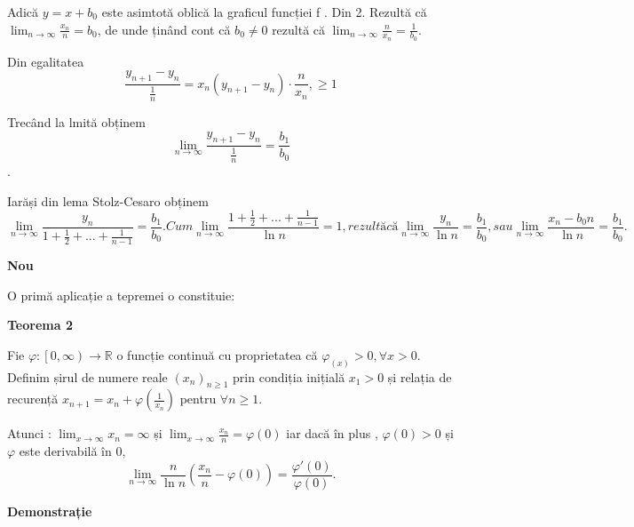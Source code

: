 \documentclass[a4paper,12pt,oneside]{report}
\begin{document}
Adică \(y=x+b_{0}\) este asimtotă oblică la graficul funcției f . Din 2. Rezultă că \(\lim_{n \to \infty }\frac{x_{n}}{n} = b_{0}\), de unde ținând cont că \(b_{0}\neq 0\) rezultă că \(\lim_{n \to \infty }\frac{n}{x_{n}} = \frac{1}{b_{0}}\). 


Din egalitatea
 \begin{displaymath}
  \frac{y_{n+1} - y_{n}}{\frac{1}{n}} = x_{n}\left ( y_{n+1} -y_{n}\right )\cdot \frac{n}{x_{n}}, \geq 1
\end{displaymath}

Trecând la lmită obținem 
\begin{displaymath}
  \lim_{n \to \infty }\frac{y_{n+1} - y_{n}}{\frac{1}{n}} = \frac{b_{1}}{b_{0}}
\end{displaymath}
.

Iarăși din lema Stolz-Cesaro obținem 
\begin{displaymath}
  \lim_{n \to \infty }\frac{y_{n}}{1+\frac{1}{2}+...+\frac{1}{n-1}} = \frac{b_{1}}{b_{0}} . Cum \lim_{n \to \infty }\frac{{1+\frac{1}{2}+...+\frac{1}{n-1}}}{\ln n} = 1, rezultă că \lim_{n \to \infty }\frac{y_{n}}{\ln n } = \frac{b_{1}}{b_{0}}, sau \lim_{n \to \infty }\frac{x_{n}-b_{0}n}{\ln n }  = \frac{b_{1}}{b_{0}}.
\end{displaymath}




\textbf{Nou}



O primă aplicație a tepremei o constituie:

\textbf{Teorema 2}

Fie \(\varphi : \left [ 0,\infty  \right ) \to \mathbb{R}\) o funcție continuă cu proprietatea că \(\varphi_{\left ( x \right )}> 0, \forall x> 0\). Definim șirul de numere reale \(\left ( x_{n} \right )_{n\geq 1}\) prin condiția inițială \(x_{1}> 0\) și relația de recurență \(x_{n+1} = x_{n} + \varphi \left ( \frac{1}{x_{n}} \right )\) pentru \(\forall  n\geq 1\). 

Atunci :
\(\lim_{x \to \infty } x_{n} = \infty\) și \(\lim_{x \to \infty }\frac{x_{n}}{n} = \varphi\left ( 0 \right )\) iar dacă în plus , \(\varphi\left ( 0 \right )> 0\) și  \(\varphi\) este derivabilă în 0, 
\begin{displaymath}
  \lim_{n \to \infty }\frac{n}{\ln n }\left ( \frac{x_{n}}{n} -\varphi \left ( 0 \right )\right ) = \frac{{\varphi }'\left ( 0 \right )}{\varphi \left ( 0 \right )}.
\end{displaymath}
 

\textbf{Demonstrație}
\end{document}
